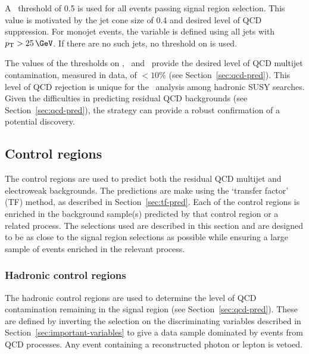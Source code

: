 A \bdphi~threshold of 0.5 is used for all events passing signal region selection.
This value is motivated by the jet cone size of 0.4 and desired level of 
QCD suppression. For monojet events, the \bdphi variable is defined using all jets with 
$\pt > 25\,\GeV$. If there are no such jets, no threshold on \bdphi is used.

The values of the thresholds on \alphat, \bdphi~and \mhtmet~provide the desired 
level of QCD multijet contamination, measured in data, of $< 10\%$
(see Section~\ref{sec:qcd-pred}). This level of QCD rejection is unique for the 
\alphat~analysis among hadronic SUSY searches. Given the difficulties in predicting
residual QCD backgrounds (see Section~\ref{sec:qcd-pred}), the \alphat strategy can provide a robust 
confirmation of a potential discovery.
%
%

\subsection{Control regions}
\label{sec:cr-sel}
The control regions are used to predict both the residual QCD multijet
and electroweak backgrounds. The predictions are make using the 
`transfer factor' (TF) method, as described in Section~\ref{sec:tf-pred}.
Each of the control regions is enriched 
in the background sample(s) predicted by that control region or a related 
process. The selections used are described in this section and are designed to 
be as close to the signal region selections as possible 
while ensuring a large sample of events enriched in the relevant process. 

\subsubsection{Hadronic control regions}
The hadronic control regions are used to determine the level of QCD contamination
remaining in the signal region (see Section~\ref{sec:qcd-pred}). These are defined by inverting the selection on the 
discriminating variables described in Section~\ref{sec:important-variables} to give a data sample 
dominated by events from QCD processes. Any event containing a reconstructed photon or lepton is vetoed.

